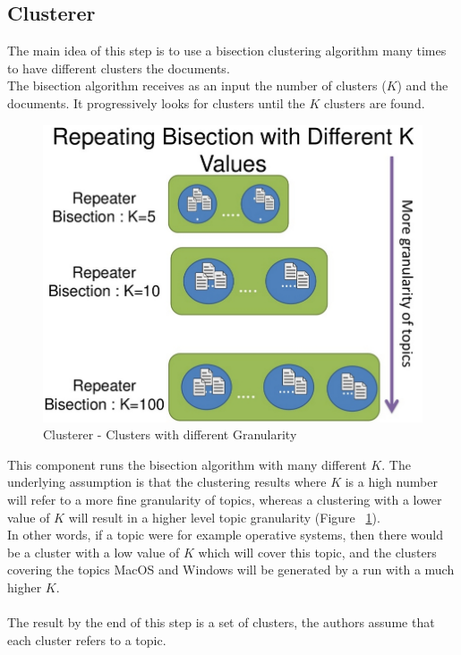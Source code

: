 \documentclass[4pt,a4paper,twocolumn]{article}
\begin{document}
\subsection{Clusterer}
The main idea of this step is to use a bisection clustering algorithm many times to have different clusters the documents.\\
The bisection algorithm receives as an input the number of clusters ($K$) and the documents. It progressively looks for clusters until the $K$ clusters are found.
\begin{figure}[]
  \centering
    \includegraphics[scale=0.2]{pics/clusterer2.jpg}
    \caption{Clusterer - Clusters with different Granularity}
   \label{fig:clusterer}  
\end{figure}

This component runs the bisection algorithm with many different $K$. The underlying assumption is that the clustering results where $K$ is a high number will refer to a more fine granularity of topics, whereas a clustering with a lower value of $K$ will result in a higher level topic granularity (Figure ~\ref{fig:clusterer}).\\
In other words, if a topic were for example operative systems, then there would be a cluster with a low value of $K$ which will cover this topic, and the clusters covering the topics MacOS and Windows will be generated by a run with a much higher $K$.\\
\\
The result by the end of this step is a set of clusters, the authors assume that each cluster refers to a topic.
\end{document}
